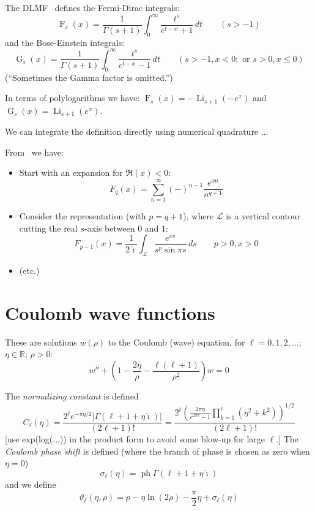 \documentclass[10pt,dvipdfmx,letterpaper,twoside]{article}
\let\O=\operatorname
\newcommand{\RR}{{\mathbb{R}}}
\newcommand{\ii}{{\hat{\imath}}}
\newenvironment{implementation}{\noindent\begin{framed}}{\end{framed}}
\let\Gam=\Gamma
\let\sig=\sigma
\let\theta=\vartheta
\begin{document}
The DLMF~\cite{DLMF} defines the Fermi-Dirac integrals:
\[ \O{F}_s(x) = \frac{1}{\Gam(s+1)} \int_0^\infty \frac{t^s}{e^{t-x} + 1}\,dt \qquad(s>-1) \]
and the Bose-Einstein integrals:
\[ \O{G}_s(x) = \frac{1}{\Gam(s+1)} \int_0^\infty \frac{t^s}{e^{t-x} - 1}\,dt \qquad(s>-1, x<0; \text{\ or\ } s>0,x\leq0) \]
(``Sometimes the Gamma factor is omitted.'')

In terms of polylogarithms we have: $\O{F}_s(x) = -\O{Li}_{s+1}(-e^{x})$ and $\O{G}_s(x) = \O{Li}_{s+1}(e^{x})$.

\begin{implementation}
We can integrate the definition directly using numerical quadrature ...

From~\cite{approximation-fermi-dirac} we have:
\begin{itemize}
\item Start with an expansion for $\Re(x)<0$:
    \[ F_q(x) = \sum_{n=1}^\infty(-)^{n-1}\frac{e^{xn}}{n^{q+1}} \]
\item Consider the representation (with $p=q+1$), where $\mathcal{L}$ is a vertical contour cutting the real
    $s$-axis between $0$ and $1$:
    \[ F_{p-1}(x) = \frac{1}{2\ii} \int_{\mathcal{L}} \frac{e^{xs}}{s^p \sin\pi s}\,ds \qquad p>0, x>0 \]
\item (etc.)
\end{itemize}
\end{implementation}

\section{Coulomb wave functions}
These are solutions $w(\rho)$ to the Coulomb (wave) equation, for $\ell=0,1,2,\dots$; $\eta\in\RR$; $\rho>0$:
\[ w'' + \left( 1 - \frac{2\eta}{\rho} - \frac{\ell(\ell+1)}{\rho^2}\right) w = 0 \]

The {\em normalizing constant} is defined
\[ C_\ell(\eta) = \frac{2^\ell e^{-\pi\eta/2} |\Gam(\ell+1+\eta\ii)|}{(2\ell+1)!}
    = \frac{2^\ell \left( \frac{2\pi\eta}{e^{2\pi\eta} - 1} \prod_{k=1}^\ell(\eta^2 + k^2)\right)^{1/2}}{(2\ell+1)!} \]
[use exp(log(...)) in the product form to avoid some blow-up for large $\ell$.]
The {\em Coulomb phase shift} is defined (where the branch of phase is chosen as zero when $\eta=0$)
\[ \sig_\ell(\eta) = \O{ph} \Gam(\ell+1+\eta\ii) \]
and we define
\[ \theta_\ell(\eta,\rho) = \rho - \eta\ln(2\rho) - \frac\pi2\eta + \sig_\ell(\eta) \]
\end{document}
